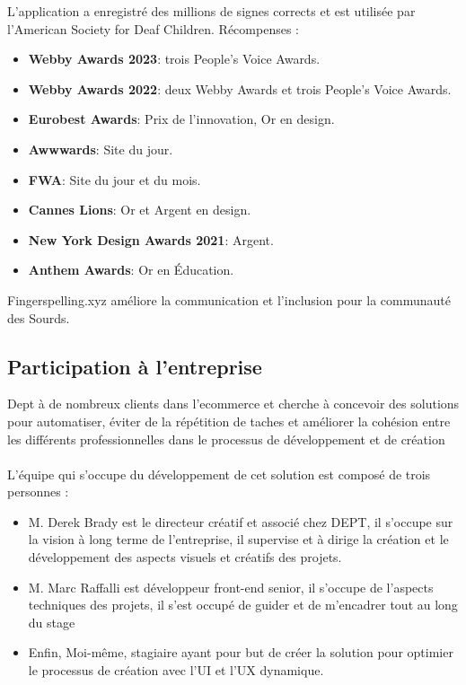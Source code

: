 L'application a enregistré des millions de signes corrects et est utilisée par l'American Society for Deaf Children. Récompenses :
\begin{itemize}
    \item \textbf{Webby Awards 2023}: trois People's Voice Awards. 
    \item \textbf{Webby Awards 2022}: deux Webby Awards et trois People's Voice Awards.
    \item \textbf{Eurobest Awards}: Prix de l'innovation, Or en design.
    \item \textbf{Awwwards}: Site du jour.
    \item \textbf{FWA}: Site du jour et du mois.
    \item \textbf{Cannes Lions}: Or et Argent en design.
    \item \textbf{New York Design Awards 2021}: Argent.
    \item \textbf{Anthem Awards}: Or en Éducation.
\end{itemize}

Fingerspelling.xyz améliore la communication et l'inclusion pour la communauté des Sourds.

\subsection{Participation à l'entreprise}

Dept à de nombreux clients dans l'ecommerce et cherche à concevoir des solutions pour automatiser, éviter de la répétition de taches et améliorer la cohésion entre les différents professionnelles dans le processus de développement et de création
\\ \\
L’équipe qui s’occupe du développement de cet solution est composé de trois personnes : 
\begin{itemize}
    \item M. Derek Brady est le directeur créatif et associé chez DEPT, il s'occupe sur la vision à long terme de l'entreprise, il supervise et à dirige la création et le développement des aspects visuels et créatifs des projets.
    \item M. Marc Raffalli est développeur front-end senior, il s'occupe de l'aspects techniques des projets, il s'est occupé de guider et de m'encadrer tout au long du stage
    \item Enfin, Moi-même, stagiaire ayant pour but de créer la solution pour optimier le processus de création avec l'UI et l'UX dynamique.
\end{itemize}


